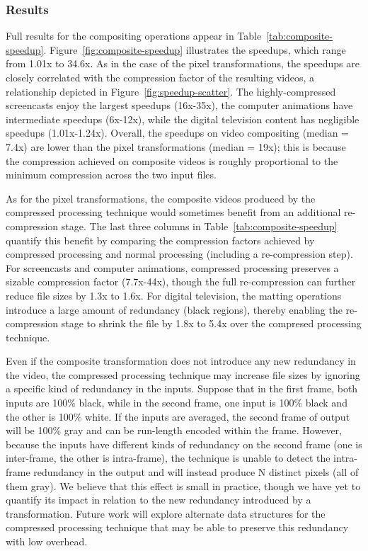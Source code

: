 \subsubsection{Results}

Full results for the compositing operations appear in
Table~\ref{tab:composite-speedup}.  Figure~\ref{fig:composite-speedup}
illustrates the speedups, which range from 1.01x to 34.6x.  As in the
case of the pixel transformations, the speedups are closely correlated
with the compression factor of the resulting videos, a relationship
depicted in Figure~\ref{fig:speedup-scatter}.  The highly-compressed
screencasts enjoy the largest speedups (16x-35x), the computer
animations have intermediate speedups (6x-12x), while the digital
television content has negligible speedups (1.01x-1.24x).  Overall,
the speedups on video compositing (median = 7.4x) are lower than the
pixel transformations (median = 19x); this is because the compression
achieved on composite videos is roughly proportional to the minimum
compression across the two input files.

As for the pixel transformations, the composite videos produced by the
compressed processing technique would sometimes benefit from an
additional re-compression stage.  The last three columns in
Table~\ref{tab:composite-speedup} quantify this benefit by comparing
the compression factors achieved by compressed processing and normal
processing (including a re-compression step).  For screencasts and
computer animations, compressed processing preserves a sizable
compression factor (7.7x-44x), though the full re-compression can
further reduce file sizes by 1.3x to 1.6x.  For digital television,
the matting operations introduce a large amount of redundancy (black
regions), thereby enabling the re-compression stage to shrink the file
by 1.8x to 5.4x over the compresed processing technique.

Even if the composite transformation does not introduce any new
redundancy in the video, the compressed processing technique may
increase file sizes by ignoring a specific kind of redundancy in the
inputs.  Suppose that in the first frame, both inputs are 100\% black,
while in the second frame, one input is 100\% black and the other is
100\% white.  If the inputs are averaged, the second frame of output
will be 100\% gray and can be run-length encoded within the frame.
However, because the inputs have different kinds of redundancy on the
second frame (one is inter-frame, the other is intra-frame), the
technique is unable to detect the intra-frame redundancy in the output
and will instead produce N distinct pixels (all of them gray).  We
believe that this effect is small in practice, though we have yet to
quantify its impact in relation to the new redundancy introduced by a
transformation.  Future work will explore alternate data structures
for the compressed processing technique that may be able to preserve
this redundancy with low overhead.

